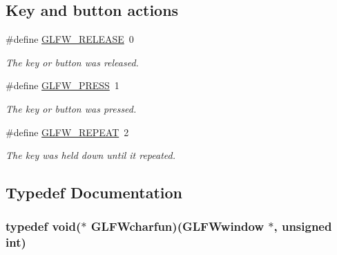 \subsection*{\-Key and button actions}
\begin{DoxyCompactItemize}
\item 
\hypertarget{group__input_gada11d965c4da13090ad336e030e4d11f}{\#define \hyperlink{group__input_gada11d965c4da13090ad336e030e4d11f}{\-G\-L\-F\-W\-\_\-\-R\-E\-L\-E\-A\-S\-E}~0}\label{group__input_gada11d965c4da13090ad336e030e4d11f}

\begin{DoxyCompactList}\small\item\em \-The key or button was released. \end{DoxyCompactList}\item 
\hypertarget{group__input_ga2485743d0b59df3791c45951c4195265}{\#define \hyperlink{group__input_ga2485743d0b59df3791c45951c4195265}{\-G\-L\-F\-W\-\_\-\-P\-R\-E\-S\-S}~1}\label{group__input_ga2485743d0b59df3791c45951c4195265}

\begin{DoxyCompactList}\small\item\em \-The key or button was pressed. \end{DoxyCompactList}\item 
\hypertarget{group__input_gac96fd3b9fc66c6f0eebaf6532595338f}{\#define \hyperlink{group__input_gac96fd3b9fc66c6f0eebaf6532595338f}{\-G\-L\-F\-W\-\_\-\-R\-E\-P\-E\-A\-T}~2}\label{group__input_gac96fd3b9fc66c6f0eebaf6532595338f}

\begin{DoxyCompactList}\small\item\em \-The key was held down until it repeated. \end{DoxyCompactList}\end{DoxyCompactItemize}


\subsection{\-Typedef \-Documentation}
\hypertarget{group__input_ga1103f1876518acecb5976f6b307c51d1}{
\subsubsection[{\-G\-L\-F\-Wcharfun}]{\setlength{\rightskip}{0pt plus 5cm}typedef void($\ast$  {\bf \-G\-L\-F\-Wcharfun})({\bf \-G\-L\-F\-Wwindow} $\ast$, unsigned int)}}\label{group__input_ga1103f1876518acecb5976f6b307c51d1}



